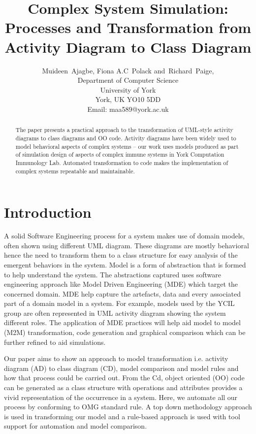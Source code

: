 \documentclass[10pt]{article}
\begin{document}
\title{Complex System Simulation: Processes and Transformation from Activity Diagram to Class Diagram}
\author{Muideen~Ajagbe,
        Fiona A.C~Polack
        and~Richard~Paige,\\
Department of Computer Science\\
University of York\\
York, UK YO10 5DD\\
Email: maa589@york.ac.uk}
\date{\vspace{-5ex}}
\maketitle
\begin{abstract}
The paper presents a practical approach to the transformation of UML-style activity diagrams to class diagrams and OO code. Activity diagrams have been widely used to model behavioral aspects of complex systems – our work uses models produced as part of simulation design of aspects of complex immune systems in York Computation Immunology Lab. Automated transformation to code makes the implementation of complex systems repeatable and maintainable.
\end{abstract}
\section{Introduction}
A solid Software Engineering process for a system makes use of domain models, often shown using different UML diagram. These diagrams are mostly behavioral hence the need to transform them to a class structure for easy analysis of the emergent behaviors in the system. Model is a form of abstraction that is formed to help understand the system. The abstractions captured uses software engineering approach like Model Driven Engineering (MDE) which target the concerned domain. MDE help capture the artefacts, data and every associated part of a domain model in a system. For example, models used by the YCIL group are often represented in UML activity diagram showing the system different roles. The application of MDE practices will help aid model to model (M2M) transformation, code generation and graphical comparison which can be further refined to aid simulations.

Our paper aims to show an approach to model transformation i.e. activity diagram (AD) to class diagram (CD), model comparison and model rules and how that process could be carried out. From the Cd, object oriented (OO) code can be generated as a class structure with operations and attributes provides a vivid representation of the occurrence in a system. Here, we automate all our process by conforming to OMG standard rule. A top down methodology approach is used in transforming our model and a rule-based approach is used with tool support for automation and model comparison. 
\end{document}
